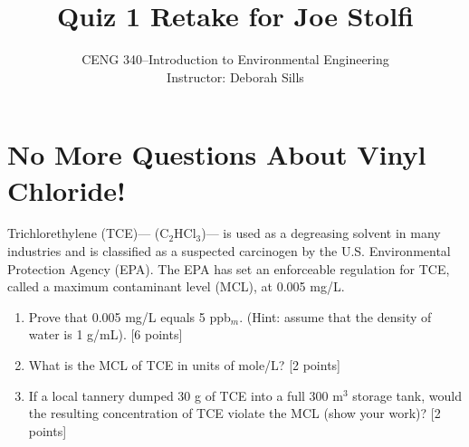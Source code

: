 \documentclass[12pt,letterpaper]{article}
\begin{document}
\setlength{\parindent}{0cm} 


\frenchspacing

\title {Quiz 1 Retake for Joe Stolfi} 
\author {CENG 340--Introduction to Environmental Engineering\\
Instructor: Deborah Sills}
\maketitle

\section *{No More Questions About Vinyl Chloride!}
Trichlorethylene (TCE)--- (C$_2$HCl$_3$)--- is used as a degreasing solvent in many industries and is classified as a suspected carcinogen by the U.S. Environmental Protection Agency (EPA).  The EPA has set an enforceable regulation for TCE, called a maximum contaminant level (MCL), at 0.005 mg/L. 
\begin{enumerate}
\item Prove that 0.005 mg/L equals 5 ppb$_m$. (Hint: assume that the density of water is 1 g/mL). [6 points] 

\vspace{2.3in}
\item What is the MCL of TCE in units of mole/L? [2 points] 

\vspace{1in}
\item If a local tannery dumped 30 g of TCE into a full 300 m$^3$ storage tank, would the resulting concentration of TCE violate the MCL (show your work)? [2 points] 


\end{enumerate}
\end{document}

